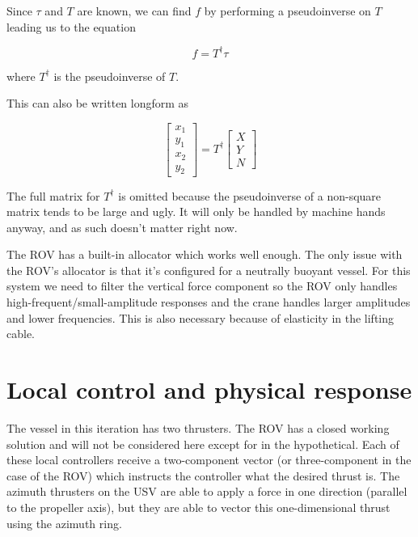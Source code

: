 \documentclass[class=article, crop=false, draft=true]{standalone}
\begin{document}
Since \(\tau\) and \(T\) are known, we can find \(f\) by performing a pseudoinverse on \(T\) leading us to the equation

\begin{equation}\label{eq:final_allocator}
f = T^\dagger \tau
\end{equation}

where \(T^\dagger\) is the pseudoinverse of \(T\).

This can also be written longform as

\begin{equation}\label{eq:long_allocator}
\begin{bmatrix}x_1 \\ y_1 \\ x_2 \\ y_2 \end{bmatrix} = T^\dagger \begin{bmatrix}X \\ Y \\ N\end{bmatrix}
\end{equation}

The full matrix for \(T^\dagger\) is omitted because the pseudoinverse of a non-square matrix tends to be large and ugly. It will only be handled by machine hands anyway, and as such doesn't matter right now.

The ROV has a built-in allocator which works well enough. The only issue with the ROV's allocator is that it's configured for a neutrally buoyant vessel. For this system we need to filter the vertical force component so the ROV only handles high-frequent/small-amplitude responses and the crane handles larger amplitudes and lower frequencies. This is also necessary because of elasticity in the lifting cable.

\section{Local control and physical response}
The vessel in this iteration has two thrusters. The ROV has a closed working solution and will not be considered here except for in the hypothetical. Each of these local controllers receive a two-component vector (or three-component in the case of the ROV) which instructs the controller what the desired thrust is. The azimuth thrusters on the USV are able to apply a force in one direction (parallel to the propeller axis), but they are able to vector this one-dimensional thrust using the azimuth ring.
\end{document}
